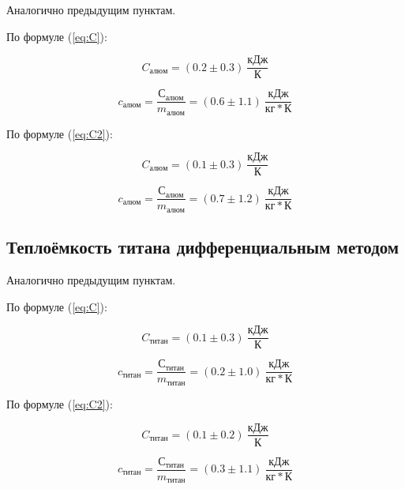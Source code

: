 \documentclass[a4paper, 12pt]{article}
\begin{document}
                Аналогично предыдущим пунктам.

                По формуле (\ref{eq:C}):

                \begin{equation*}
                    C_{алюм} = (0.2 \pm 0.3)~\frac{кДж}{К}
                \end{equation*}

                \begin{equation*}
                    c_{алюм} = \frac{С_{алюм}}{m_{алюм}} = (0.6 \pm 1.1)~\frac{кДж}{кг*К}
                \end{equation*}

                По формуле (\ref{eq:C2}):

                \begin{equation*}
                    C_{алюм} = (0.1 \pm 0.3)~\frac{кДж}{К}
                \end{equation*}

                \begin{equation*}
                    c_{алюм} = \frac{С_{алюм}}{m_{алюм}} = (0.7 \pm 1.2)~\frac{кДж}{кг*К}
                \end{equation*}

            \subsection{Теплоёмкость титана дифференциальным методом}

                Аналогично предыдущим пунктам.

                По формуле (\ref{eq:C}):

                \begin{equation*}
                    C_{титан} = (0.1 \pm 0.3)~\frac{кДж}{К}
                \end{equation*}

                \begin{equation*}
                    c_{титан} = \frac{С_{титан}}{m_{титан}} = (0.2 \pm 1.0)~\frac{кДж}{кг*К}
                \end{equation*}

                По формуле (\ref{eq:C2}):

                \begin{equation*}
                    C_{титан} = (0.1 \pm 0.2)~\frac{кДж}{К}
                \end{equation*}

                \begin{equation*}
                    c_{титан} = \frac{С_{титан}}{m_{титан}} = (0.3 \pm 1.1)~\frac{кДж}{кг*К}
                \end{equation*}
\end{document}
